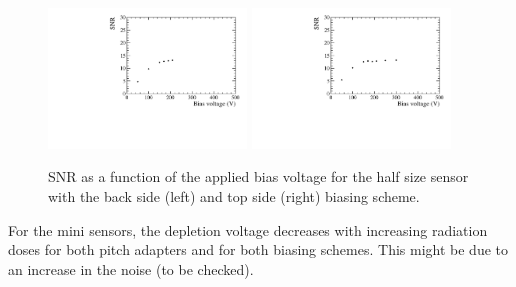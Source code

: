 \begin{figure}[]
\centering
\includegraphics[width=0.47\textwidth]{figs/SNRvsBias/cSNRvsBias_F1_FanUp_Back.pdf}
\includegraphics[width=0.47\textwidth]{figs/SNRvsBias/cSNRvsBias_F1_FanUp_Top.pdf}
\caption[SNR as a function of the applied bias voltage for the half size sensor.]{SNR as a function of the applied bias voltage for the half size sensor with the back side (left) and top side (right) biasing scheme.}
\label{fig:DepletionVoltageF}
\end{figure}

For the mini sensors, the depletion voltage decreases with increasing radiation doses for both pitch adapters and for both biasing schemes. This might be due to an increase in the noise (to be checked).

